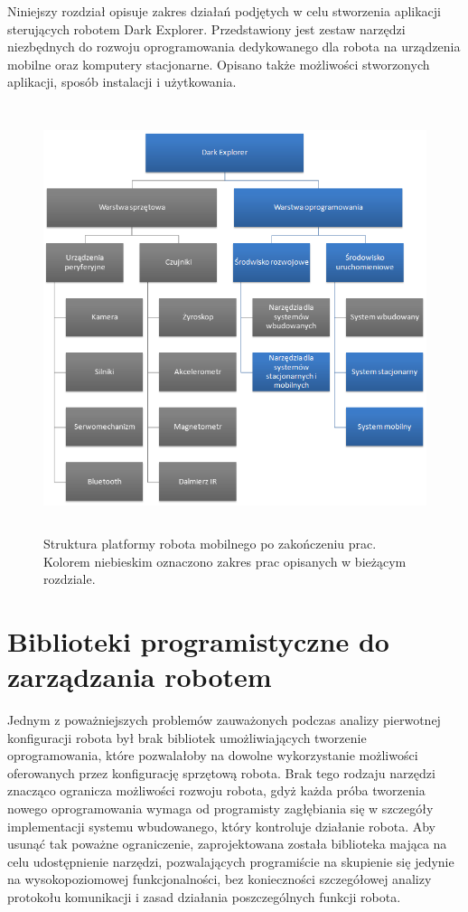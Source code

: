 Niniejszy rozdział opisuje zakres działań podjętych w celu stworzenia aplikacji
sterujących robotem Dark Explorer. Przedstawiony jest zestaw narzędzi niezbędnych
do rozwoju oprogramowania dedykowanego dla robota na urządzenia mobilne oraz
komputery stacjonarne. Opisano także możliwości stworzonych aplikacji, sposób
instalacji i użytkowania.

\begin{figure}[!ht]
 \centering
 \includegraphics[height=125mm]{../images/ch03/dark_explorer_platform_ide_stac_mob.png}
 \caption{Struktura platformy robota mobilnego po zakończeniu prac. Kolorem
 niebieskim oznaczono zakres prac opisanych w bieżącym rozdziale.}
 \label{fig:DarkExplorerPlatformStacMob}
\end{figure}

\section{Biblioteki programistyczne do zarządzania robotem}
Jednym z poważniejszych problemów zauważonych podczas analizy pierwotnej
konfiguracji robota był brak bibliotek umożliwiających tworzenie oprogramowania,
które pozwalałoby na dowolne wykorzystanie możliwości oferowanych przez
konfigurację sprzętową robota. Brak tego rodzaju narzędzi znacząco ogranicza
możliwości rozwoju robota, gdyż każda próba tworzenia nowego oprogramowania wymaga
od programisty zagłębiania się w szczegóły implementacji systemu wbudowanego,
który kontroluje działanie robota. Aby usunąć tak poważne ograniczenie,
zaprojektowana została biblioteka mająca na celu udostępnienie narzędzi,
pozwalających programiście na skupienie się jedynie na wysokopoziomowej
funkcjonalności, bez konieczności szczegółowej analizy protokołu komunikacji i
zasad działania poszczególnych funkcji robota.

